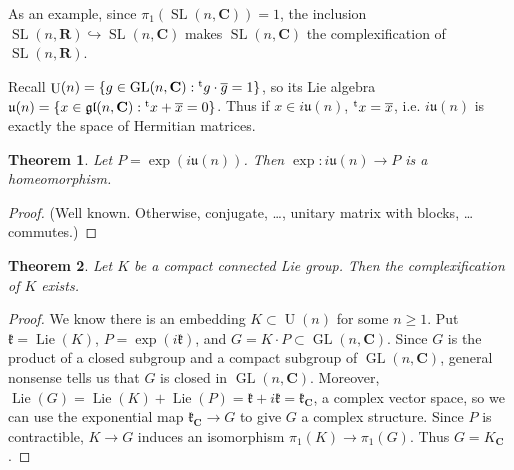 \documentclass{article}
\DeclareMathOperator{\GL}{GL}
\DeclareMathOperator{\Lie}{Lie}
\DeclareMathOperator{\SL}{SL}
\DeclareMathOperator{\U}{U}
\newcommand{\bC}{{\mathbf C}}
\newcommand{\bR}{{\mathbf R}}
\newcommand{\fgl}{\mathfrak{gl}}
\newcommand{\fk}{{\mathfrak k}}
\newcommand{\fu}{{\mathfrak u}}
\newcommand{\transpose}[1]{\prescript{\mathrm{t}}{}{#1}}
\newtheorem{theorem}{Theorem}
\theoremstyle{definition}
\begin{document}
As an example, since $\pi_1(\SL(n,\bC))=1$, the inclusion 
$\SL(n,\bR)\hookrightarrow \SL(n,\bC)$ makes $\SL(n,\bC)$ the complexification 
of $\SL(n,\bR)$. 

Recall $\U(n)=\{g\in \GL(n,\bC) : \transpose g \cdot \overline g=1\}$, so 
its Lie algebra $\fu(n)=\{x\in \fgl(n,\bC) : \transpose x + \overline x=0\}$. 
Thus if $x\in i \fu(n)$, $\transpose x = \overline x$, i.e. 
$i\fu(n)$ is exactly the space of Hermitian matrices. 

\begin{theorem}
Let $P=\exp(i\fu(n))$. Then $\exp\colon i\fu(n)\to P$ is a homeomorphism. 
\end{theorem}
\begin{proof}
(Well known. Otherwise, conjugate, \ldots, unitary matrix with blocks, \ldots 
commutes.)
\end{proof}

\begin{theorem}
Let $K$ be a compact connected Lie group. Then the complexification of $K$ 
exists. 
\end{theorem}
\begin{proof}
We know there is an embedding $K\subset \U(n)$ for some $n\geqslant 1$. Put 
$\fk=\Lie(K)$, $P=\exp(i \fk)$, and $G=K\cdot P\subset \GL(n,\bC)$. Since 
$G$ is the product of a closed subgroup and a compact subgroup of $\GL(n,\bC)$, 
general nonsense tells us that $G$ is closed in $\GL(n,\bC)$. Moreover, 
$\Lie(G)=\Lie(K)+\Lie(P) = \fk+i\fk = \fk_\bC$, a complex vector space, so we 
can use the exponential map $\fk_\bC \to G$ to give $G$ a complex structure. 
Since $P$ is contractible, $K\to G$ induces an isomorphism 
$\pi_1(K)\to \pi_1(G)$. Thus $G=K_\bC$. 
\end{proof}
\end{document}

